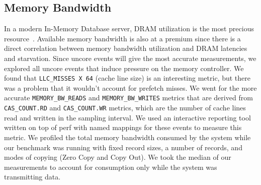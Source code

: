 


\subsection{Memory Bandwidth}
In a modern In-Memory Database server, DRAM utilization is the most precious resource~\cite{ramcloudfast}. 
 Available memory bandwidth is also at a premium since there is a direct correlation between memory bandwidth
 utilization and DRAM latencies and starvation. Since uncore events will give the most accurate measurements,
 we explored all uncore events that induce pressure on the memory controller. We found that 
\texttt{LLC\_MISSES X 64} (cache line size) is an interesting metric, but there was a problem that it wouldn't account for prefetch 
 misses. We went for the more accurate \texttt{MEMORY\_BW\_READS} and \texttt{MEMORY\_BW\_WRITES} metrics that are derived from 
 \texttt{CAS\_COUNT.RD} and \texttt{CAS\_COUNT.WR} metrics, which are the number of cache lines read and written in the sampling 
 interval. We used an interactive reporting tool written on top of perf with named mappings for these events
 to measure this metric. We profiled the total memory bandwidth consumed by the system while our benchmark 
 was running with fixed record sizes, a number of records, and modes of copying (Zero Copy and Copy Out). We took the median of our measurements 
 to account for consumption only while the system was transmitting data.


